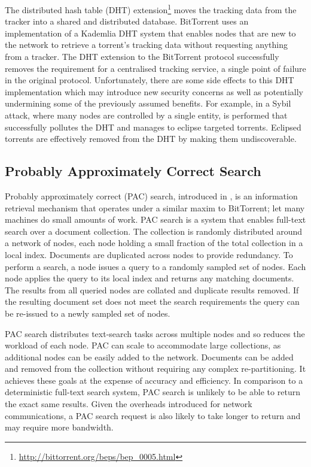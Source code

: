     The distributed hash table (DHT) extension\footnote{\url{http://bittorrent.org/beps/bep_0005.html}} moves the tracking data from the tracker into a shared and distributed database. BitTorrent uses an implementation of a Kademlia DHT system\cite{maymounkov_kademlia:_2002} that enables nodes that are new to the network to retrieve a torrent's tracking data without requesting anything from a tracker. The DHT extension to the BitTorrent protocol successfully removes the requirement for a centralised tracking service, a single point of failure in the original protocol. Unfortunately, there are some side effects to this DHT implementation which may introduce new security concerns as well as potentially undermining some of the previously assumed benefits. For example, in \cite{Timpanaro2011} a Sybil attack, where many nodes are controlled by a single entity, is performed that successfully pollutes the DHT and manages to eclipse targeted torrents. Eclipsed torrents are effectively removed from the DHT by making them undiscoverable.

\subsection{Probably Approximately Correct Search}

    Probably approximately correct (PAC) search, introduced in \cite{Cox2009}, is an information retrieval mechanism that operates under a similar maxim to BitTorrent; let many machines do small amounts of work. PAC search is a system that enables full-text search over a document collection. The collection is randomly distributed around a network of nodes, each node holding a small fraction of the total collection in a local index. Documents are duplicated across nodes to provide redundancy. To perform a search, a node issues a query to a randomly sampled set of nodes. Each node applies the query to its local index and returns any matching documents. The results from all queried nodes are collated and duplicate results removed. If the resulting document set does not meet the search requirements the query can be re-issued to a newly sampled set of nodes.

    PAC search distributes text-search tasks across multiple nodes and so reduces the workload of each node. PAC can scale to accommodate large collections, as additional nodes can be easily added to the network\cite{Cox2009}. Documents can be added and removed from the collection without requiring any complex re-partitioning. It achieves these goals at the expense of accuracy and efficiency\cite{Asthana2011,Cox}. In comparison to a deterministic full-text search system, PAC search is unlikely to be able to return the exact same results. Given the overheads introduced for network communications, a PAC search request is also likely to take longer to return and may require more bandwidth.

